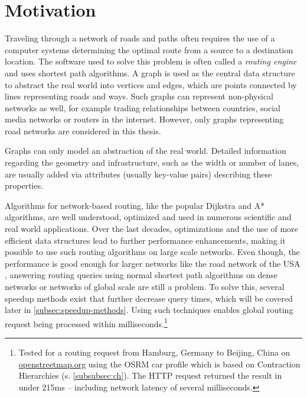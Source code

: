 
\section{Motivation}
	
	Traveling through a network of roads and paths often requires the use of a computer systems determining the optimal route from a source to a destination location.
	The software used to solve this problem is often called a \emph{routing engine} and uses shortest path algorithms.
	A graph is used as the central data structure to abstract the real world into vertices and edges, which are points connected by lines representing roads and ways.
	Such graphs can represent non-physical networks as well, for example trading relationships between countries, social media networks or routers in the internet.
	However, only graphs representing road networks are considered in this thesis.
	
	Graphs can only model an abstraction of the real world.
	Detailed information regarding the geometry and infrastructure, such as the width or number of lanes, are usually added via attributes (usually key-value pairs) describing these properties.
	
	Algorithms for network-based routing, like the popular Dijkstra and A* algorithms, are well understood, optimized and used in numerous scientific and real world applications.
	Over the last decades, optimizations and the use of more efficient data structures lead to further performance enhancements, making it possible to use such routing algorithms on large scale networks.
	Even though, the performance is good enough for larger networks like the road network of the USA \cite{aviram-optimizing-dijkstra}, answering routing queries using normal shortest path algorithms on dense networks or networks of global scale are still a problem.
	To solve this, several speedup methods exist that further decrease query times, which will be covered later in \cref{subsec:speedup-methods}.
	Using such techniques enables global routing request being processed within milliseconds.\footnote{Tested for a routing request from Hamburg, Germany to Beijing, China on \href{https://www.openstreetmap.org/directions?engine=fossgis\_osrm\_car&route=53.55\%2C10.00\%3B39.91\%2C116.39}{openstreetmap.org} using the OSRM car profile which is based on Contraction Hierarchies (s. \cref{subsubsec:ch}). The HTTP request returned the result in under 215ms -- including network latency of several milliseconds.}
	
